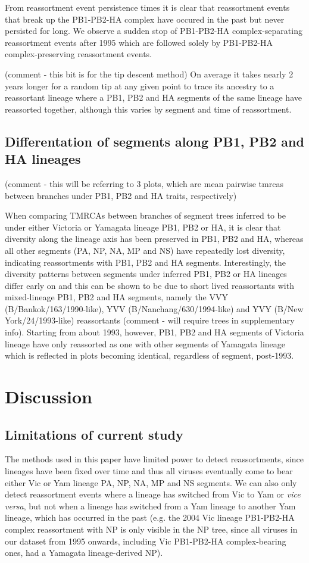 \documentclass[11pt,oneside,letterpaper]{article}
\begin{document}
From reassortment event persistence times it is clear that reassortment events that break up the PB1-PB2-HA complex have occured in the past but never persisted for long.
We observe a sudden stop of PB1-PB2-HA complex-separating reassortment events after 1995 which are followed solely by PB1-PB2-HA complex-preserving reassortment events.

(comment - this bit is for the tip descent method)
On average it takes nearly 2 years longer for a random tip at any given point to trace its ancestry to a reassortant lineage where a PB1, PB2 and HA segments of the same lineage have reassorted together, although this varies by segment and time of reassortment.


\subsection*{Differentation of segments along PB1, PB2 and HA lineages}
(comment - this will be referring to 3 plots, which are mean pairwise tmrcas between branches under PB1, PB2 and HA traits, respectively)

When comparing TMRCAs between branches of segment trees inferred to be under either Victoria or Yamagata lineage PB1, PB2 or HA, it is clear that diversity along the lineage axis has been preserved in PB1, PB2 and HA, whereas all other segments (PA, NP, NA, MP and NS) have repeatedly lost diversity, indicating reassortments with PB1, PB2 and HA segments.
Interestingly, the diversity patterns between segments under inferred PB1, PB2 or HA lineages differ early on and this can be shown to be due to short lived reassortants with mixed-lineage PB1, PB2 and HA segments, namely the VVY (B/Bankok/163/1990-like), YVV (B/Nanchang/630/1994-like) and YVY (B/New York/24/1993-like) reassortants (comment - will require trees in supplementary info).
Starting from about 1993, however, PB1, PB2 and HA segments of Victoria lineage have only reassorted as one with other segments of Yamagata lineage which is reflected in plots becoming identical, regardless of segment, post-1993.


\section*{Discussion}

\subsection*{Limitations of current study}
The methods used in this paper have limited power to detect reassortments, since lineages have been fixed over time and thus all viruses eventually come to bear either Vic or Yam lineage PA, NP, NA, MP and NS segments.
We can also only detect reassortment events where a lineage has switched from Vic to Yam or \textit{vice versa}, but not when a lineage has switched from a Yam lineage to another Yam lineage, which has occurred in the past (e.g. the 2004 Vic lineage PB1-PB2-HA complex reassortment with NP is only visible in the NP tree, since all viruses in our dataset from 1995 onwards, including Vic PB1-PB2-HA complex-bearing ones, had a Yamagata lineage-derived NP).
\end{document}
